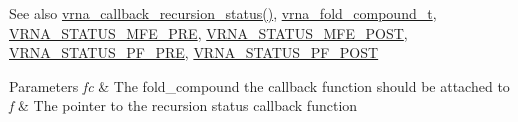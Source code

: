 \begin{DoxySeeAlso}{See also}
\hyperlink{group__fold__compound_gac86036fa8cad1108832335063243cdc8}{vrna\+\_\+callback\+\_\+recursion\+\_\+status()}, \hyperlink{group__fold__compound_ga1b0cef17fd40466cef5968eaeeff6166}{vrna\+\_\+fold\+\_\+compound\+\_\+t}, \hyperlink{group__fold__compound_ga1a5053dc8acbb0111e852988726f07d6}{V\+R\+N\+A\+\_\+\+S\+T\+A\+T\+U\+S\+\_\+\+M\+F\+E\+\_\+\+P\+RE}, \hyperlink{group__fold__compound_ga47c900ca76e56e59e2e83a06e0bde641}{V\+R\+N\+A\+\_\+\+S\+T\+A\+T\+U\+S\+\_\+\+M\+F\+E\+\_\+\+P\+O\+ST}, \hyperlink{group__fold__compound_ga91795d35ebdb6f32be50459f24b3d114}{V\+R\+N\+A\+\_\+\+S\+T\+A\+T\+U\+S\+\_\+\+P\+F\+\_\+\+P\+RE}, \hyperlink{group__fold__compound_ga1c6fa243533fd026e50f7d595eaaa565}{V\+R\+N\+A\+\_\+\+S\+T\+A\+T\+U\+S\+\_\+\+P\+F\+\_\+\+P\+O\+ST}
\end{DoxySeeAlso}

\begin{DoxyParams}{Parameters}
{\em fc} & The fold\+\_\+compound the callback function should be attached to \\
\hline
{\em f} & The pointer to the recursion status callback function \\
\hline
\end{DoxyParams}
